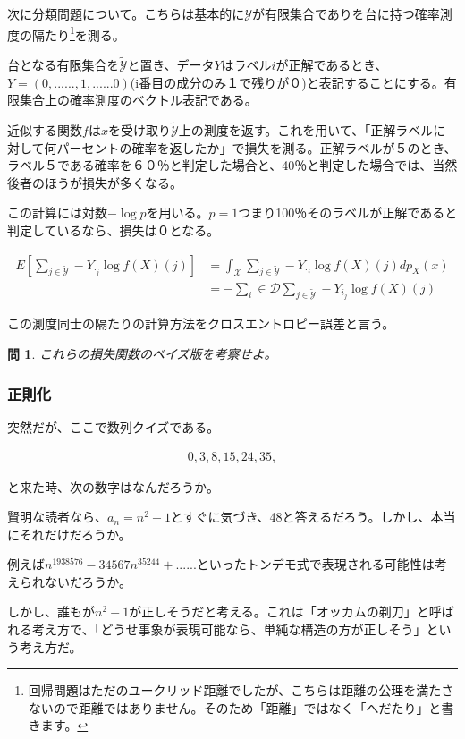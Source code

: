 \documentclass{jsarticle}
\newtheorem{pro}{問}[section]
\begin{document}
次に分類問題について。こちらは基本的に$\mathcal{Y}$が有限集合でありを台に持つ確率測度の隔たり\footnote{回帰問題はただのユークリッド距離でしたが、こちらは距離の公理を満たさないので距離ではありません。そのため「距離」ではなく「へだたり」と書きます。}を測る。

台となる有限集合を$\tilde{\mathcal{Y}}$と置き、データ$Y$はラベル$i$が正解であるとき、$Y=(0,......,1,......0)$(i番目の成分のみ１で残りが０)と表記することにする。有限集合上の確率測度のベクトル表記である。

近似する関数$f$は$x$を受け取り$\tilde{\mathcal{Y}}$上の測度を返す。これを用いて、「正解ラベルに対して何パーセントの確率を返したか」で損失を測る。正解ラベルが５のとき、ラベル５である確率を６０％と判定した場合と、40％と判定した場合では、当然後者のほうが損失が多くなる。

この計算には対数$-\log{p}$を用いる。$p=1$つまり100％そのラベルが正解であると判定しているなら、損失は０となる。

\begin{align}
E[\sum_{j\in\tilde{\mathcal{Y}}} -Y_{\cdot_j} \log{f(X)(j)}]&=\int_\mathcal{X} \sum_{j\in\tilde{\mathcal{Y}}} -Y_{\cdot_j} \log{f(X)(j)}dp_{X}(x)\\
&=-\sum_i\in\mathcal{D} \sum_{j\in\tilde{\mathcal{Y}}} -Y_{i_j} \log{f(X)(j)}
\end{align}

この測度同士の隔たりの計算方法をクロスエントロピー誤差と言う。

\begin{pro}
これらの損失関数のベイズ版を考察せよ。
\end{pro}


\subsubsection{正則化}

突然だが、ここで数列クイズである。

\begin{align}
0,3,8,15,24,35,
\end{align}

と来た時、次の数字はなんだろうか。

賢明な読者なら、$a_n=n^2-1$とすぐに気づき、48と答えるだろう。しかし、本当にそれだけだろうか。

例えば$n^1938576-34567n^35244+......$といったトンデモ式で表現される可能性は考えられないだろうか。

しかし、誰もが$n^2-1$が正しそうだと考える。これは「オッカムの剃刀」と呼ばれる考え方で、「どうせ事象が表現可能なら、単純な構造の方が正しそう」という考え方だ。
\end{document}
